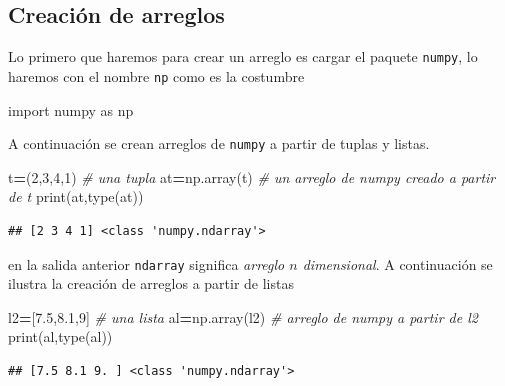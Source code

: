 \documentclass[
]{book}
\newenvironment{Shaded}{\begin{snugshade}}{\end{snugshade}}
\newcommand{\BuiltInTok}[1]{#1}
\newcommand{\CommentTok}[1]{\textcolor[rgb]{0.56,0.35,0.01}{\textit{#1}}}
\newcommand{\DecValTok}[1]{\textcolor[rgb]{0.00,0.00,0.81}{#1}}
\newcommand{\FloatTok}[1]{\textcolor[rgb]{0.00,0.00,0.81}{#1}}
\newcommand{\ImportTok}[1]{#1}
\newcommand{\NormalTok}[1]{#1}
\newcommand{\OperatorTok}[1]{\textcolor[rgb]{0.81,0.36,0.00}{\textbf{#1}}}
\theoremstyle{definition}
\theoremstyle{definition}
\theoremstyle{definition}
\theoremstyle{definition}
\theoremstyle{remark}
\begin{document}
\hypertarget{creaciuxf3n-de-arreglos}{%
\subsection{Creación de arreglos}\label{creaciuxf3n-de-arreglos}}

Lo primero que haremos para crear un arreglo es cargar el paquete \texttt{numpy}, lo haremos con el nombre \texttt{np} como es la costumbre

\begin{Shaded}
\begin{Highlighting}[]
\ImportTok{import}\NormalTok{ numpy }\ImportTok{as}\NormalTok{ np}
\end{Highlighting}
\end{Shaded}

A continuación se crean arreglos de \texttt{numpy} a partir de tuplas y listas.

\begin{Shaded}
\begin{Highlighting}[]
\NormalTok{t}\OperatorTok{=}\NormalTok{(}\DecValTok{2}\NormalTok{,}\DecValTok{3}\NormalTok{,}\DecValTok{4}\NormalTok{,}\DecValTok{1}\NormalTok{) }\CommentTok{\# una tupla }
\NormalTok{at}\OperatorTok{=}\NormalTok{np.array(t) }\CommentTok{\# un arreglo de numpy creado a partir de t  }
\BuiltInTok{print}\NormalTok{(at,}\BuiltInTok{type}\NormalTok{(at))}
\end{Highlighting}
\end{Shaded}

\begin{verbatim}
## [2 3 4 1] <class 'numpy.ndarray'>
\end{verbatim}

en la salida anterior \texttt{ndarray} significa \emph{arreglo \(n\) dimensional}. A continuación se ilustra la creación de arreglos a partir de listas

\begin{Shaded}
\begin{Highlighting}[]
\NormalTok{l2}\OperatorTok{=}\NormalTok{[}\FloatTok{7.5}\NormalTok{,}\FloatTok{8.1}\NormalTok{,}\DecValTok{9}\NormalTok{] }\CommentTok{\# una lista  }
\NormalTok{al}\OperatorTok{=}\NormalTok{np.array(l2) }\CommentTok{\# arreglo de numpy a partir de l2 }
\BuiltInTok{print}\NormalTok{(al,}\BuiltInTok{type}\NormalTok{(al))}
\end{Highlighting}
\end{Shaded}

\begin{verbatim}
## [7.5 8.1 9. ] <class 'numpy.ndarray'>
\end{verbatim}
\end{document}
